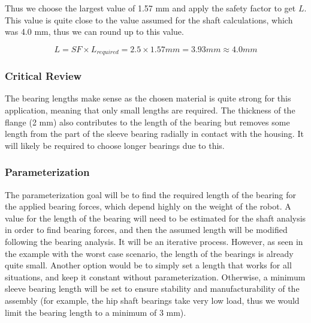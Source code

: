 Thus we choose the largest value of 1.57 mm and apply the safety factor to get $L$. This value is quite close to the value assumed for the shaft calculations, which was 4.0 mm, thus we can round up to this value. 

\begin{equation}
    L=SF\times L_{required}=2.5\times 1.57 mm = 3.93 mm \approx 4.0 mm
\end{equation}


\subsubsection{Critical Review}
The bearing lengths make sense as the chosen material is quite strong for this application, meaning that only small lengths are required. The thickness of the flange (2 mm) also contributes to the length of the bearing but removes some length from the part of the sleeve bearing radially in contact with the housing. It will likely be required to choose longer bearings due to this. 

\subsubsection{Parameterization}
The parameterization goal will be to find the required length of the bearing for the applied bearing forces, which depend highly on the weight of the robot. A value for the length of the bearing will need to be estimated for the shaft analysis in order to find bearing forces, and then the assumed length will be modified following the bearing analysis. It will be an iterative process. 
However, as seen in the example with the worst case scenario, the length of the bearings is already quite small. Another option would be to simply set a length that works for all situations, and keep it constant without parameterization. Otherwise, a minimum sleeve bearing length will be set to ensure stability and manufacturability of the assembly (for example, the hip shaft bearings take very low load, thus we would limit the bearing length to a minimum of 3 mm).